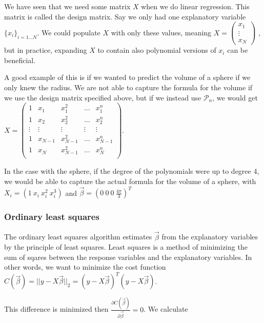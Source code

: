 \documentclass[12pt]{article}
\newcommand{\bbeta}{\vec{\beta}}
\begin{document}

We have seen that we need some matrix $X$ when we do linear regression.
This matrix is called the design matrix. Say we only had one explanatory variable $\{x_i\}_{i=1...N}$.
We could populate $X$ with only these values, meaning
$X=\begin{pmatrix}
    x_1 \\
    \vdots \\
    x_N
\end{pmatrix}$
, but in practice, expanding $X$ to contain also polynomial versions of $x_i$ can be beneficial.

A good example of this is if we wanted to predict the volume of a sphere if we only knew the radius.
We are not able to capture the formula for the volume if we use the design matrix specified above,
but if we instead use $\mathcal{P}_n$, we would get
$X=\begin{pmatrix}
    1 & x_1 & x_1^2 & ... & x_1^n \\   
    1 & x_2 & x_2^2 & ... & x_2^n \\   
    \vdots & \vdots & \vdots & \vdots & \vdots\\   
    1 & x_{N-1} & x_{N-1}^2 & ... & x_{N-1}^n \\   
    1 & x_N & x_{N-1}^2 & ... & x_N^n \\   
\end{pmatrix}$.

In the case with the sphere, if the degree of the polynomials were up to degree 4, we would be able to capture the actual formula for the volume of a sphere, with $X_i=(1\ x_i\ x_i^2\ x_i^3)$ and $\bbeta=(0\ 0\ 0\ \frac{4\pi}{3})^T$


\subsubsection{Ordinary least squares}

The ordinary least squares algorithm estimates $\bbeta$ from the explanatory variables by the principle of least squares.
Least squares is a method of minimizing the sum of sqares between the response variables and the explanatory variables.
In other words, we want to minimize the cost function $C(\bbeta)=||y - X\bbeta||_2=(y-X \bbeta)^T(y-X\bbeta)$.

This difference is minimized then $\frac{\partial C(\bbeta)}{\partial \bbeta} = 0$. We calculate
\end{document}
